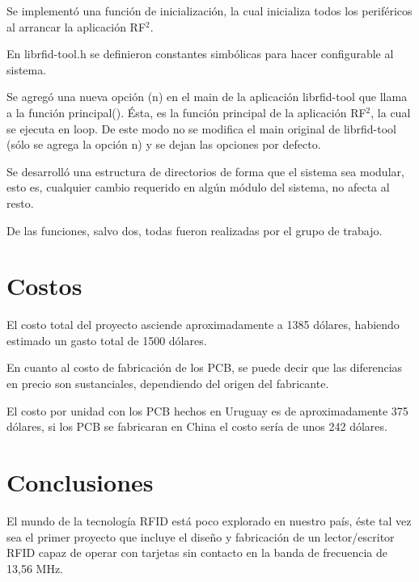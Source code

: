 \documentclass[%
        final,
        notitlepage,
        narroweqnarray,
        inline,
        ]{ieee}
\begin{document}

Se implementó una función de inicialización, la cual inicializa todos los periféricos al arrancar la aplicación RF$^{2}$.

En librfid-tool.h se definieron constantes simbólicas para hacer configurable al sistema. 

Se agregó una nueva opción (n) en el main de la aplicación librfid-tool que llama a la función principal(). Ésta, es la función principal de la aplicación RF$^{2}$, la cual se ejecuta en loop.
De este modo no se modifica el main original de librfid-tool (sólo se agrega la opción n) y se dejan las opciones por defecto.

\bigskip
{}

Se desarrolló una estructura de directorios de forma que el sistema sea modular, esto es, cualquier cambio requerido en algún módulo del sistema, no afecta al resto.

De las funciones, salvo dos, todas fueron realizadas por el grupo de trabajo.


\section{Costos}

El costo total del proyecto asciende aproximadamente a 1385 dólares, habiendo 
estimado un gasto total de 1500 dólares.

En cuanto al costo de fabricación de los PCB, se puede decir
que las diferencias en precio son sustanciales, dependiendo
del origen del fabricante. 

El costo por unidad con los PCB hechos en Uruguay es de aproximadamente 375 dólares, si los PCB se fabricaran en China el costo sería de unos 242 dólares.



\section{Conclusiones}
El mundo de la tecnología RFID está poco explorado en nuestro país, éste 
tal vez sea el primer proyecto que incluye el diseño y fabricación de un 
lector/escritor RFID capaz de operar con tarjetas sin contacto en la banda de
frecuencia de 13,56 MHz.
\end{document}

